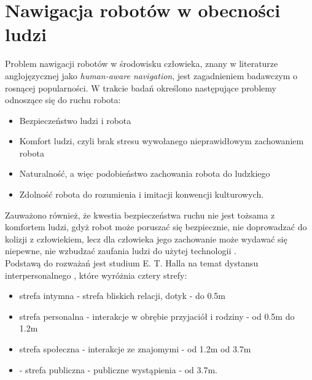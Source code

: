 \chapter{Nawigacja robotów w obecności ludzi}

Problem nawigacji robotów w środowisku człowieka, znany w literaturze anglojęzycznej jako {\textit{human-aware navigation}}, jest zagadnieniem badawczym o rosnącej popularności. W trakcie badań określono następujące problemy odnoszące się do ruchu robota\cite{survey}:

\begin{itemize}
\item Bezpieczeństwo ludzi i robota
\item Komfort ludzi, czyli brak stresu wywołanego nieprawidłowym zachowaniem robota
\item Naturalność, a więc podobieństwo zachowania robota do ludzkiego
\item Zdolność robota do rozumienia i imitacji konwencji kulturowych.
\end{itemize}

Zauważono również, że kwestia bezpieczeństwa ruchu nie jest tożsama z komfortem ludzi, gdyż robot może poruszać się bezpiecznie, nie doprowadzać do kolizji z człowiekiem, lecz dla człowieka jego zachowanie może wydawać się niepewne, nie wzbudzać zaufania ludzi do użytej technologii \cite{survey}. \\

\indent Podstawą do rozważań jest studium E. T. Halla na temat dystansu interpersonalnego \cite{dimension}, które wyróżnia cztery strefy:

\begin{itemize}
\item strefa intymna - strefa bliskich relacji, dotyk - do 0.5m
\item strefa personalna - interakcje w obrębie przyjaciół i rodziny - od 0.5m do 1.2m
\item strefa społeczna - interakcje ze znajomymi - od 1.2m od 3.7m
\item - strefa publiczna - publiczne wystąpienia - od 3.7m.
\end{itemize}

